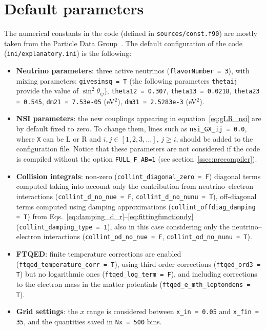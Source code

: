 \documentclass[notitlepage,nofootinbib,showpacs,preprintnumbers,amsmath,amssymb,superscriptaddress,prd,onecolumn]{revtex4-1}
\begin{document}
\section{Default parameters}
\label{ssec:default}
The numerical constants in the code (defined in \texttt{sources/const.f90})
are mostly taken from the Particle Data Group~\cite{Tanabashi:2018oca,Zyla:2020zbs}.
The default configuration of the code (\texttt{ini/explanatory.ini}) is the following:
\begin{itemize}
\item
\textbf{Neutrino parameters}: three active neutrinos (\texttt{flavorNumber = 3}), with mixing parameters:
\texttt{givesinsq = T} (the following parameters \texttt{thetaij} provide the value of $\sin^2\theta_{ij}$),
\texttt{theta12 = 0.307},
\texttt{theta13 = 0.0218},
\texttt{theta23 = 0.545},
\texttt{dm21 = 7.53e-05} (eV$^2$),
\texttt{dm31 = 2.5283e-3} (eV$^2$).
%
\item
\textbf{NSI parameters}: the new couplings appearing in equation~\eqref{eq:gLR_nsi} are by default fixed to zero.
To change them, lines such as \texttt{nsi\_GX\_ij = 0.0}, where \texttt{X} can be L or R and $i, j\in[1,2,3,\ldots],\, j\geq i$, should be added to the configuration file.
Notice that these parameters are not considered if the code is compiled without the option \texttt{FULL\_F\_AB=1} (see section~\ref{ssec:precompiler}).
%
\item
\textbf{Collision integrals}: non-zero (\texttt{collint\_diagonal\_zero = F}) diagonal terms
computed taking into account only the contribution from neutrino--electron interactions
(\texttt{collint\_d\_no\_nue = F}, \texttt{collint\_d\_no\_nunu = T}),
off-diagonal terms computed using damping approximations
(\texttt{collint\_offdiag\_damping = T})
from Eqs.~\eqref{eq:damping_d_r}--\eqref{eq:fittingfunctiondy} (\texttt{collint\_damping\_type = 1}),
also in this case considering only the neutrino--electron interactions
(\texttt{collint\_od\_no\_nue = F}, \texttt{collint\_od\_no\_nunu = T}).
%
\item
\textbf{FTQED}:
finite temperature corrections are enabled
(\texttt{ftqed\_temperature\_corr = T}),
using third order corrections (\texttt{ftqed\_ord3 = T})
but no logarithmic ones (\texttt{ftqed\_log\_term = F}),
and including corrections to the electron mass in the matter potentials
(\texttt{ftqed\_e\_mth\_leptondens = T}).
%
\item
\textbf{Grid settings}:
the $x$ range is considered between
\texttt{x\_in = 0.05} and
\texttt{x\_fin = 35},
and the quantities saved in \texttt{Nx = 500} bins.

\end{itemize}
\end{document}

